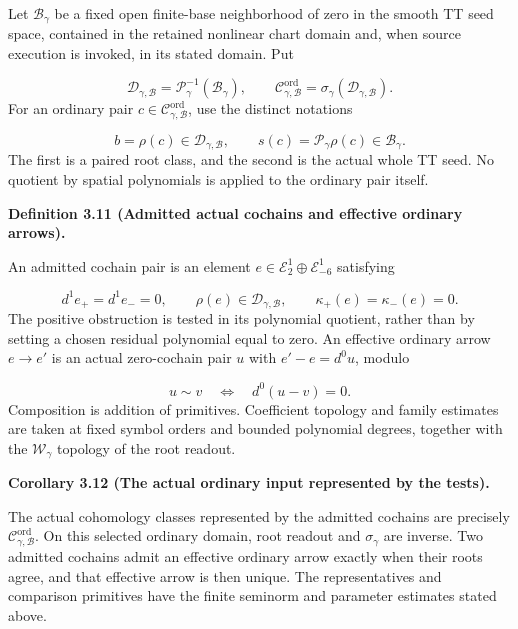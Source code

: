 \documentclass[
  english,
  11pt,
  reqno]{amsart}
\makeatletter
\newcommand{\pandocstatementheading}[1]{%
  \par\addpenalty{\@beginparpenalty}%
  \addvspace{.5\baselineskip plus .2\baselineskip minus .2\baselineskip}%
  {\normalfont\bfseries #1\par}%
  \nobreak\@afterindenttrue\@afterheading
}
\makeatother
\begin{document}
Let \(\mathcal B_\gamma\) be a fixed open finite-base neighborhood of
zero in the smooth TT seed space, contained in the retained nonlinear
chart domain and, when source execution is invoked, in its stated
domain. Put

\label{eq:online-selected-ordinary-class-domain} \[
\mathscr D_{\gamma,\mathcal B}=\mathscr P_\gamma^{-1}(\mathcal B_\gamma),
\qquad
\mathscr C^{\mathrm{ord}}_{\gamma,\mathcal B}
=\sigma_\gamma(\mathscr D_{\gamma,\mathcal B}).
\] For an ordinary pair
\(c\in\mathscr C^{\mathrm{ord}}_{\gamma,\mathcal B}\), use the distinct
notations

\label{eq:online-ordinary-root-seed-types} \[
b=\rho(c)\in\mathscr D_{\gamma,\mathcal B},
\qquad
s(c)=\mathscr P_\gamma\rho(c)\in\mathcal B_\gamma.
\] The first is a paired root class, and the second is the actual whole
TT seed. No quotient by spatial polynomials is applied to the ordinary
pair itself.

\pandocstatementheading{\leavevmode{}\label{def:online-effective-ordinary-cochain-domain}Definition 3.11 (Admitted actual cochains and effective ordinary
arrows).}

An admitted cochain pair is an element
\(e\in\mathscr E_2^1\oplus\mathscr E_{-6}^1\) satisfying

\label{eq:online-effective-ordinary-admission} \[
d^1e_+=d^1e_-=0,
\qquad \rho(e)\in\mathscr D_{\gamma,\mathcal B},
\qquad \kappa_+(e)=\kappa_-(e)=0.
\] The positive obstruction is tested in its polynomial quotient, rather
than by setting a chosen residual polynomial equal to zero. An effective
ordinary arrow \(e\to e'\) is an actual zero-cochain pair \(u\) with
\(e'-e=d^0u\), modulo

\label{eq:online-effective-ordinary-arrows} \[
u\sim v\quad\Longleftrightarrow\quad d^0(u-v)=0.
\] Composition is addition of primitives. Coefficient topology and
family estimates are taken at fixed symbol orders and bounded polynomial
degrees, together with the \(\mathscr W_\gamma\) topology of the root
readout.

\pandocstatementheading{\leavevmode{}\label{cor:online-effective-ordinary-class-identification}Corollary 3.12 (The actual ordinary input represented by the tests).}

The actual cohomology classes represented by the admitted cochains are
precisely \(\mathscr C^{\mathrm{ord}}_{\gamma,\mathcal B}\). On this
selected ordinary domain, root readout and \(\sigma_\gamma\) are
inverse. Two admitted cochains admit an effective ordinary arrow exactly
when their roots agree, and that effective arrow is then unique. The
representatives and comparison primitives have the finite seminorm and
parameter estimates stated above.
\end{document}
